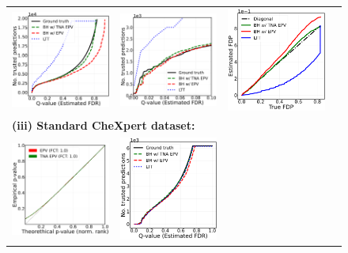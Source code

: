 \documentclass{article}
\begin{document}
\begin{figure}[h!]
\begin{tabular}{cccc}
		\includegraphics[width=1.7in]{img/cnn_pcam_balanced_fdr_control.png} & 
		\includegraphics[width=1.7in]{img/cnn_pcam_balanced_fdr_control_loc.png} &
		\includegraphics[width=1.7in]{img/cnn_FDPscat_pcam_balanced.png}\\
		\multicolumn{4}{l}{\bf (iii) Standard CheXpert dataset:}\\	
		\includegraphics[width=1.7in]{img/cnn_QQ_chx.png} 		&
		\includegraphics[width=1.7in]{img/cnn_chx_fdr_control.png} & 

\end{tabular}
\end{figure}
\end{document}
